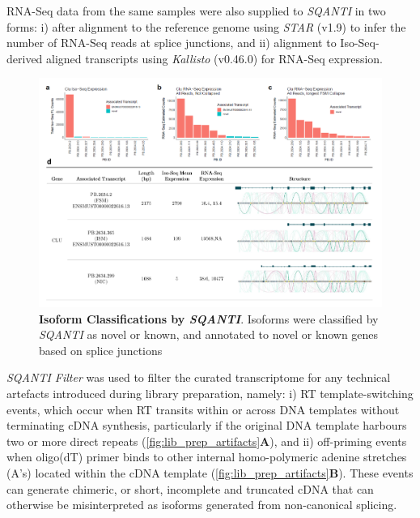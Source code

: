 RNA-Seq data from the same samples were also supplied to \textit{SQANTI} in two forms: i) after alignment to the reference genome using \textit{STAR}\cite{Dobin2013} (v1.9) to infer the number of RNA-Seq reads at splice junctions, and ii) alignment to Iso-Seq-derived aligned transcripts using \textit{Kallisto}\cite{Bray2016} (v0.46.0) for RNA-Seq expression.  

\begin{landscape}
	\begin{figure}[h]
		\centering
		\includegraphics[page=3,trim={0 4cm 0 0},clip,scale = 0.9]{Figures/ProjectDevelopment_Figures_Landscape}
		\captionsetup{width=1.5\textwidth}
		\caption[Isoform Classifications by \textit{SQANTI}]%
		{\textbf{Isoform Classifications by \textit{SQANTI}}. Isoforms were classified by \textit{SQANTI} as novel or known, and annotated to novel or known genes based on splice junctions}
		\label{fig:sqanti_cate}
	\end{figure}
\end{landscape}

\textit{SQANTI Filter} was used to filter the curated transcriptome for any technical artefacts introduced during library preparation, namely: i) RT template-switching events, which occur when RT transits within or across DNA templates without terminating cDNA synthesis, particularly if the original DNA template harbours two or more direct repeats\cite{Cocquet2006} (\cref{fig:lib_prep_artifacts}\textbf{A}), and ii) off-priming events when oligo(dT) primer binds to other internal homo-polymeric adenine stretches (A's) located within the cDNA template\cite{Conesa2016} (\cref{fig:lib_prep_artifacts}\textbf{B}). These events can generate chimeric, or short, incomplete and truncated cDNA that can otherwise be misinterpreted as isoforms generated from non-canonical splicing\cite{Houseley2010}. 

